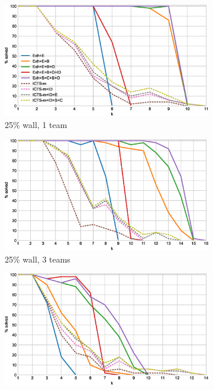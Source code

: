 \documentclass[english]{article}
\newcommand\graphwidth{0.49\textwidth}
\begin{document}
	\begin{figure}[t]
		\centering
		\begin{subfigure}{\graphwidth}
			\centering
			\includegraphics[width=\linewidth]{img/results/icts-comparison/25-1-p}
			\caption{25\% wall, 1 team}
			\label{fig:i-25-1-p}
		\end{subfigure}
		\begin{subfigure}{\graphwidth}
			\centering
			\includegraphics[width=\linewidth]{img/results/icts-comparison/25-3-p}
			\caption{25\% wall, 3 teams}
			\label{fig:i-25-3-p}
		\end{subfigure}
		\begin{subfigure}{\graphwidth}
			\centering
			\includegraphics[width=\linewidth]{img/results/icts-comparison/75-1-p}

\end{subfigure}
\end{figure}
\end{document}
